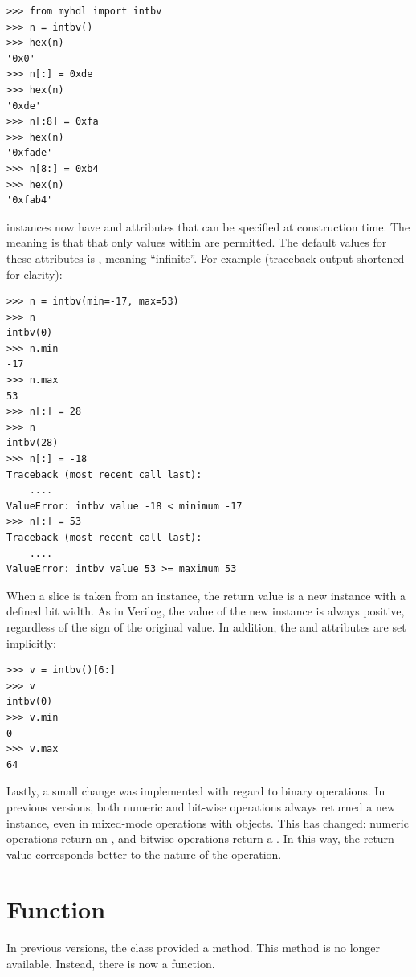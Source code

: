 \documentclass{howto}
\begin{document}
\begin{verbatim}
>>> from myhdl import intbv
>>> n = intbv()
>>> hex(n)
'0x0'
>>> n[:] = 0xde
>>> hex(n)
'0xde'
>>> n[:8] = 0xfa
>>> hex(n)
'0xfade'
>>> n[8:] = 0xb4
>>> hex(n)
'0xfab4'
\end{verbatim}

 instances now have  and  attributes
that can be specified at construction time. The meaning is that that
only values within  are permitted. The default
values for these attributes is , meaning ``infinite''. For
example (traceback output shortened for clarity):

\begin{verbatim}
>>> n = intbv(min=-17, max=53)
>>> n
intbv(0)
>>> n.min
-17
>>> n.max
53
>>> n[:] = 28
>>> n
intbv(28)
>>> n[:] = -18
Traceback (most recent call last):
    ....
ValueError: intbv value -18 < minimum -17
>>> n[:] = 53
Traceback (most recent call last):
    ....
ValueError: intbv value 53 >= maximum 53
\end{verbatim}

When a slice is taken from an  instance, the return value
is a new  instance with a defined bit width. As in
Verilog, the value of the new  instance is always
positive, regardless of the sign of the original value. In addition,
the  and  attributes are set implicitly:

\begin{verbatim}
>>> v = intbv()[6:]
>>> v
intbv(0)
>>> v.min
0
>>> v.max
64
\end{verbatim}

Lastly, a small change was implemented with regard to 
binary operations. In previous versions, both numeric
and bit-wise operations always returned a new 
instance, even in mixed-mode operations with 
objects. This has changed: numeric operations 
return an , and bitwise operations return
a . In this way, the return value corresponds
better to the nature of the operation.

\section{Function  \label{section-concat}}

In previous versions, the  class provided a
 method.  This method is no longer
available. Instead, there is now a  function.
\end{document}
